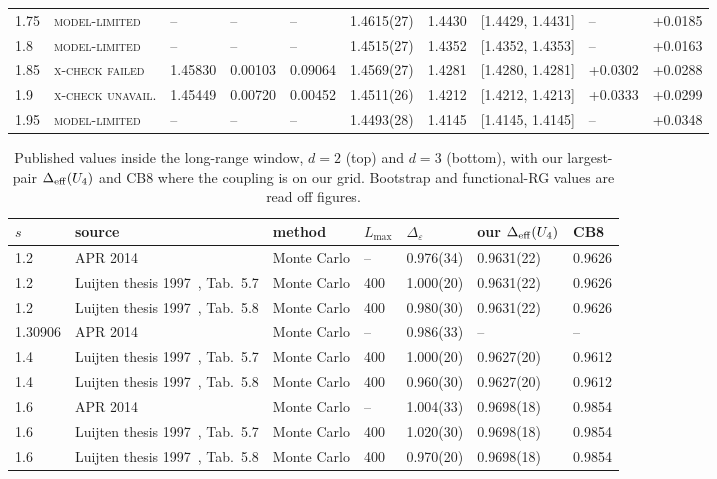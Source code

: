 \documentclass[10pt,a4paper]{article}
\newcommand{\De}{\Delta_\varepsilon}
\newcommand{\Deff}{\Delta_{\rm eff}}
\newcommand{\lbl}[1]{{\mdseries\scshape #1}}
\begin{document}
\begin{table}[htbp]
\begin{tabular}{@{}llllllllll@{}}
1.75 & \lbl{model-limited} & -- & -- & -- & 1.4615(27) & 1.4430 & [1.4429, 1.4431] & -- & +0.0185 \\
1.8 & \lbl{model-limited} & -- & -- & -- & 1.4515(27) & 1.4352 & [1.4352, 1.4353] & -- & +0.0163 \\
1.85 & \lbl{x-check failed} & 1.45830 & 0.00103 & 0.09064 & 1.4569(27) & 1.4281 & [1.4280, 1.4281] & +0.0302 & +0.0288 \\
1.9 & \lbl{x-check unavail.} & 1.45449 & 0.00720 & 0.00452 & 1.4511(26) & 1.4212 & [1.4212, 1.4213] & +0.0333 & +0.0299 \\
1.95 & \lbl{model-limited} & -- & -- & -- & 1.4493(28) & 1.4145 & [1.4145, 1.4145] & -- & +0.0348 \\
\bottomrule\end{tabular}
\end{table}
\begin{table}[htbp]\centering\scriptsize
\caption{Published values inside the long-range window, $d=2$ (top) and $d=3$ (bottom), with our largest-pair $\Deff(U_4)$ and CB8 where the
coupling is on our grid. Bootstrap and functional-RG values are read off figures.}\label{tab:lit23}
\begin{tabular}{@{}lllllll@{}}\toprule
$s$ & source & method & $L_{\max}$ & $\De$ & our $\Deff(U_4)$ & CB8 \\\midrule
1.2 & APR 2014~\cite{Angelini:2014koy} & Monte Carlo & -- & 0.976(34) & 0.9631(22) & 0.9626 \\
1.2 & Luijten thesis 1997~\cite{Luijten:1997th}, Tab.~5.7 & Monte Carlo & 400 & 1.000(20) & 0.9631(22) & 0.9626 \\
1.2 & Luijten thesis 1997~\cite{Luijten:1997th}, Tab.~5.8 & Monte Carlo & 400 & 0.980(30) & 0.9631(22) & 0.9626 \\
1.30906 & APR 2014~\cite{Angelini:2014koy} & Monte Carlo & -- & 0.986(33) & -- & -- \\
1.4 & Luijten thesis 1997~\cite{Luijten:1997th}, Tab.~5.7 & Monte Carlo & 400 & 1.000(20) & 0.9627(20) & 0.9612 \\
1.4 & Luijten thesis 1997~\cite{Luijten:1997th}, Tab.~5.8 & Monte Carlo & 400 & 0.960(30) & 0.9627(20) & 0.9612 \\
1.6 & APR 2014~\cite{Angelini:2014koy} & Monte Carlo & -- & 1.004(33) & 0.9698(18) & 0.9854 \\
1.6 & Luijten thesis 1997~\cite{Luijten:1997th}, Tab.~5.7 & Monte Carlo & 400 & 1.020(30) & 0.9698(18) & 0.9854 \\
1.6 & Luijten thesis 1997~\cite{Luijten:1997th}, Tab.~5.8 & Monte Carlo & 400 & 0.970(20) & 0.9698(18) & 0.9854 \\

\end{tabular}
\end{table}
\end{document}
